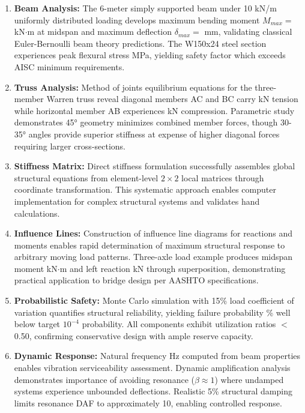 \documentclass[11pt,a4paper]{article}
\begin{document}
\begin{enumerate}
\item \textbf{Beam Analysis:} The 6-meter simply supported beam under 10 kN/m uniformly distributed loading develops maximum bending moment $M_{max} = $  kN$\cdot$m at midspan and maximum deflection $\delta_{max} = $  mm, validating classical Euler-Bernoulli beam theory predictions. The W150x24 steel section experiences peak flexural stress  MPa, yielding safety factor  which exceeds AISC minimum requirements.

\item \textbf{Truss Analysis:} Method of joints equilibrium equations for the three-member Warren truss reveal diagonal members AC and BC carry  kN tension while horizontal member AB experiences  kN compression. Parametric study demonstrates 45° geometry minimizes combined member forces, though 30-35° angles provide superior stiffness at expense of higher diagonal forces requiring larger cross-sections.

\item \textbf{Stiffness Matrix:} Direct stiffness formulation successfully assembles global structural equations from element-level $2 \times 2$ local matrices through coordinate transformation. This systematic approach enables computer implementation for complex structural systems and validates hand calculations.

\item \textbf{Influence Lines:} Construction of influence line diagrams for reactions and moments enables rapid determination of maximum structural response to arbitrary moving load patterns. Three-axle load example produces midspan moment  kN$\cdot$m and left reaction  kN through superposition, demonstrating practical application to bridge design per AASHTO specifications.

\item \textbf{Probabilistic Safety:} Monte Carlo simulation with 15\% load coefficient of variation quantifies structural reliability, yielding failure probability \% well below target $10^{-4}$ probability. All components exhibit utilization ratios $<$ 0.50, confirming conservative design with ample reserve capacity.

\item \textbf{Dynamic Response:} Natural frequency  Hz computed from beam properties enables vibration serviceability assessment. Dynamic amplification analysis demonstrates importance of avoiding resonance ($\beta \approx 1$) where undamped systems experience unbounded deflections. Realistic 5\% structural damping limits resonance DAF to approximately 10, enabling controlled response.
\end{enumerate}
\end{document}
